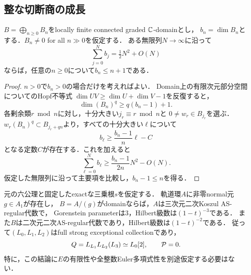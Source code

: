 \documentclass[11pt,a4paper]{ltjsarticle}
\begin{document}
\subsection{整な切断商の成長}

\begin{lemma}[稠密な次数supportにおける成長の上界]
\label{lem:dense-support-growth}
$B=\bigoplus_{n\geq0}B_n$をlocally finite connected graded $\mathbb C$-domainとし，
$b_n=\dim B_n$とする．$B_n\ne0$ for all $n\gg0$を仮定する．
ある無限列$N\to\infty$に沿って
\[
 \sum_{j=0}^{N}b_j=\tfrac12N^2+O(N)
\]
ならば，任意の$n\geq0$について$b_n\leq n+1$である．
\end{lemma}

\begin{proof}
$n>0$で$b_n>0$の場合だけを考えればよい．
Domain上の有限次元部分空間についてのHopf不等式
$\dim UV\geq\dim U+\dim V-1$を反復すると，
\[
 \dim (B_n)^q\geq q(b_n-1)+1.
\]
各剰余類$r\bmod n$に対し，十分大きい$j_r\equiv r\bmod n$と
$0\ne w_r\in B_{j_r}$を選ぶ．
$w_r(B_n)^q\subset B_{j_r+qn}$より，すべての十分大きい$\ell$について
\[
 b_\ell\geq\frac{b_n-1}{n}\ell-C
\]
となる定数$C$が存在する．これを加えると
\[
 \sum_{\ell=0}^N b_\ell
 \geq \frac{b_n-1}{2n}N^2-O(N).
\]
仮定した無限列に沿って主要項を比較し，$b_n-1\leq n$を得る．
\end{proof}

\begin{theorem}[次数1の整なnormal切断による認識]
\label{thm:normal-domain-recognition}
元の六公理と固定したexactな三乗根$s$を仮定する．
軌道環$A$に非零normal元$g\in A_1$が存在し，
$B=A/(g)$がdomainならば，$A$は三次元二次Koszul AS-regular代数で，
Gorenstein parameterは$3$，Hilbert級数は$(1-t)^{-3}$である．
また$B$は二次元二次AS-regular代数であり，Hilbert級数は$(1-t)^{-2}$である．
従って$(L_0,L_1,L_2)$はfull strong exceptional collectionであり，
\[
 Q=L_{L_1}L_{L_2}(L_3)\simeq L_0[2],\qquad \mathcal P=0.
\]
特に，この結論に$E$の有限性や全整数Euler多項式性を別途仮定する必要はない．
\end{theorem}
\end{document}
